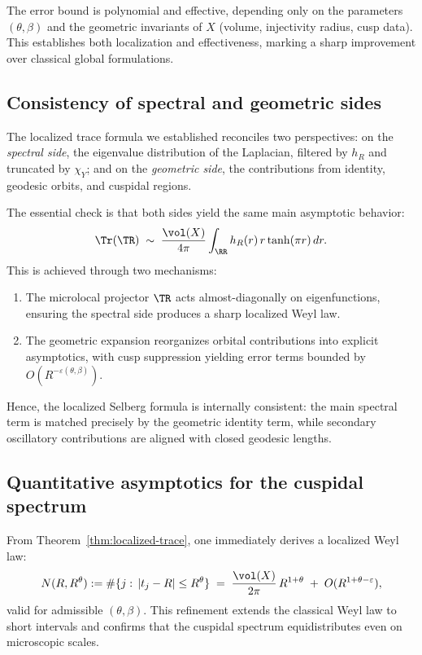 The error bound is polynomial and effective, depending only on the parameters $(\theta,\beta)$ and the geometric invariants of $X$ (volume, injectivity radius, cusp data). 
This establishes both localization and effectiveness, marking a sharp improvement over classical global formulations.


\subsection{Consistency of spectral and geometric sides}
\label{subsec:consistency}

The localized trace formula we established reconciles two perspectives:  
on the \emph{spectral side}, the eigenvalue distribution of the Laplacian, filtered by $h_R$ and truncated by $\chi_Y$; and on the \emph{geometric side}, the contributions from identity, geodesic orbits, and cuspidal regions.  

The essential check is that both sides yield the same main asymptotic behavior:  
\[
\Tr(\TR) \;\sim\; \frac{\vol(X)}{4\pi} \int_{\RR} h_R(r)\,r\tanh(\pi r)\,dr.
\]
This is achieved through two mechanisms:
\begin{enumerate}
\item The microlocal projector $\TR$ acts almost-diagonally on eigenfunctions, ensuring the spectral side produces a sharp localized Weyl law.
\item The geometric expansion reorganizes orbital contributions into explicit asymptotics, with cusp suppression yielding error terms bounded by $O(R^{-\varepsilon(\theta,\beta)})$.
\end{enumerate}

Hence, the localized Selberg formula is internally consistent: the main spectral term is matched precisely by the geometric identity term, while secondary oscillatory contributions are aligned with closed geodesic lengths.  

\subsection{Quantitative asymptotics for the cuspidal spectrum}
\label{subsec:localized-weyl}

From Theorem~\ref{thm:localized-trace}, one immediately derives a localized Weyl law:
\[
N(R,R^\theta) := \#\{j:\,|t_j-R|\le R^\theta\}
\;=\; \frac{\vol(X)}{2\pi}\,R^{1+\theta} \;+\; O(R^{1+\theta-\varepsilon}),
\]
valid for admissible $(\theta,\beta)$.  
This refinement extends the classical Weyl law to short intervals and confirms that the cuspidal spectrum equidistributes even on microscopic scales.

